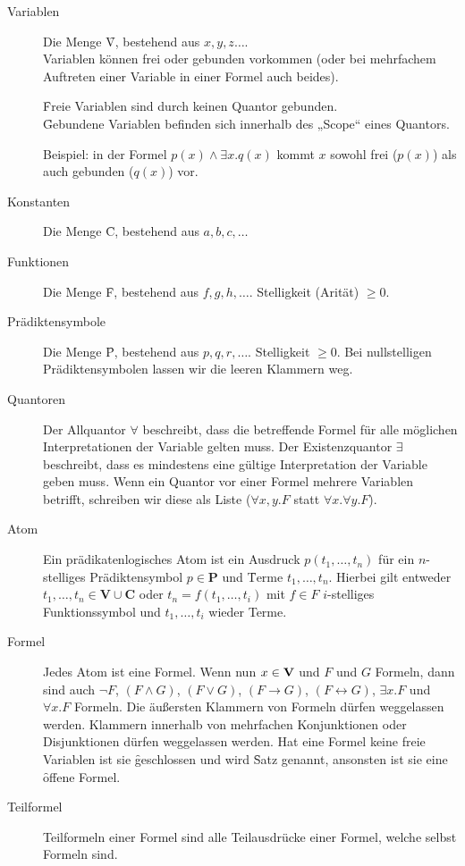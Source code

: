     \begin{description}
        \item[Variablen] Die Menge \f{V}, bestehend aus $x, y, z\dots$. \\
            Variablen können frei oder gebunden vorkommen (oder bei mehrfachem Auftreten einer Variable in einer Formel auch beides).

            \f{Freie} Variablen sind durch keinen Quantor gebunden. \\
            \f{Gebundene} Variablen befinden sich innerhalb des „Scope“ eines Quantors.

            Beispiel: in der Formel $p(x) \land \exists x.q(x)$ kommt $x$ sowohl frei ($p(x)$) als auch gebunden ($q(x)$) vor.

        \item[Konstanten] Die Menge \f{C}, bestehend aus $a,b,c,\dots$

        \item[Funktionen] Die Menge \f{F}, bestehend aus $f, g, h, \dots$. Stelligkeit (Arität) $\geq 0$.

        \item[Prädiktensymbole] Die Menge \f{P}, bestehend aus $p,q,r,\dots$. Stelligkeit $\geq 0$. Bei nullstelligen Prädiktensymbolen lassen wir die leeren Klammern weg.

        \item[Quantoren] Der Allquantor $\forall$ beschreibt, dass die betreffende Formel für alle möglichen Interpretationen der Variable gelten muss. Der Existenzquantor $\exists$ beschreibt, dass es mindestens eine gültige Interpretation der Variable geben muss. Wenn ein Quantor vor einer Formel mehrere Variablen betrifft, schreiben wir diese als Liste ($\forall x,y.F$ statt $\forall x.\forall y.F$).

        \item[Atom] Ein prädikatenlogisches Atom ist ein Ausdruck $p(t_{1},\dots,t_{n})$ für ein $n$-stelliges Prädiktensymbol $p \in \mathbf{P}$ und \f{Terme} $t_{1},\dots,t_{n}$. Hierbei gilt entweder $t_{1},\dots,t_{n} \in \mathbf{V} \cup \mathbf{C}$ oder $t_{n} = f(t_{1},\dots,t_{i})$ mit $f \in F$ $i$-stelliges Funktionssymbol und $t_{1},\dots,t_{i}$ wieder Terme.

        \item[Formel] Jedes Atom ist eine Formel. Wenn nun $x\in\textbf{V}$ und $F$ und $G$ Formeln, dann sind auch $\neg F$, $(F\land G)$, $(F\lor G)$, $(F\to G)$, $(F\leftrightarrow G)$, $\exists x.F$ und $\forall x.F$ Formeln. Die äußersten Klammern von Formeln dürfen weggelassen werden. Klammern innerhalb von mehrfachen Konjunktionen oder Disjunktionen dürfen weggelassen werden. Hat eine Formel keine freie Variablen ist sie \f{geschlossen} und wird \f{Satz} genannt, ansonsten ist sie eine \f{offene} Formel.

        \item[Teilformel] Teilformeln einer Formel sind alle Teilausdrücke einer Formel, welche selbst Formeln sind.
    \end{description}


